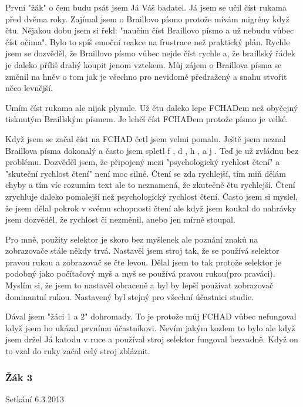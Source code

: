 První "žák" o čem budu psát jsem Já Váš badatel.  Já jsem se učil číst rukama před dvěma roky. Zajímal jsem o Braillovo písmo protože mívám migrény když čtu.  Nějakou dobu jsem si řekl: "naučím číst Braillovo písmo a už nebudu vůbec číst očima".  Bylo to spíš emoční reakce na frustrace než praktický plán.  Rychle jsem se dozvěděl, že Braillovo písmo vůbec nejde číst rychle a, že braillský řádek je daleko příliš drahý koupit jenom vztekem.  Můj zájem o Braillova písma se změnil na hněv o tom jak je všechno pro nevidomé předražený a snahu stvořit něco levnější.

Umím číst rukama ale nijak plynule.  Už čtu daleko lepe FCHADem než obyčejný tisknutým Braillským písmem.  Je lehčí číst FCHADem protože písmo je velké.

Když jsem se začal číst na FCHAD četl jsem velmi pomalu.  Ještě jsem neznal Braillova písma dokonalý a často jsem spletl f , d , h , a j . Teď je už zvládnu bez problému.  Dozvěděl jsem, že připojený mezi "psychologický rychlost čtení" a "skuteční rychlost čtení" není moc silné.  Čtení se zda rychlejší, tím miň dělám chyby a tím víc rozumím text ale to neznamená, že zkutečně čtu rychlejší.  Čtení zrychluje daleko pomalejší než psychologický rychlost čtení.  Často jsem si myslel, že jsem dělal pokrok v svému schopnosti čtení ale když jsem koukal do nahrávky jsem dozvěděl, že rychlost či nezměnil, anebo jen mírně stoupal.

Pro mně, použity selektor je skoro bez myšlenek ale poznání znaků na zobrazovače stále někdy trvá.  Nastavěl jsem stroj tak, že se používá selektor pravou rukou a zobrazovač se čte levou. Dělal jsem to tak protože selektor je podobný jako počítačový myš a myš se používá pravou rukou(pro praváci).  Myslím si, že jsem to nastavěl obraceně a byl by lepší používat zobrazovač dominantní rukou.  Nastavený byl stejný pro všechní účastnici studie.

Dával jsem "žáci 1 a 2" dohromady.  To je protože můj FCHAD vůbec nefungoval když jsem ho ukázal prvnímu účastníkovi. Nevím jakým kozlem to bylo ale když jsem držel Já katodu v ruce a používal stroj selektor fungoval bezvadně. Když on to vzal do ruky začal celý stroj zbláznit.


\subsubsection{Žák 3}

Setkání 6.3.2013

